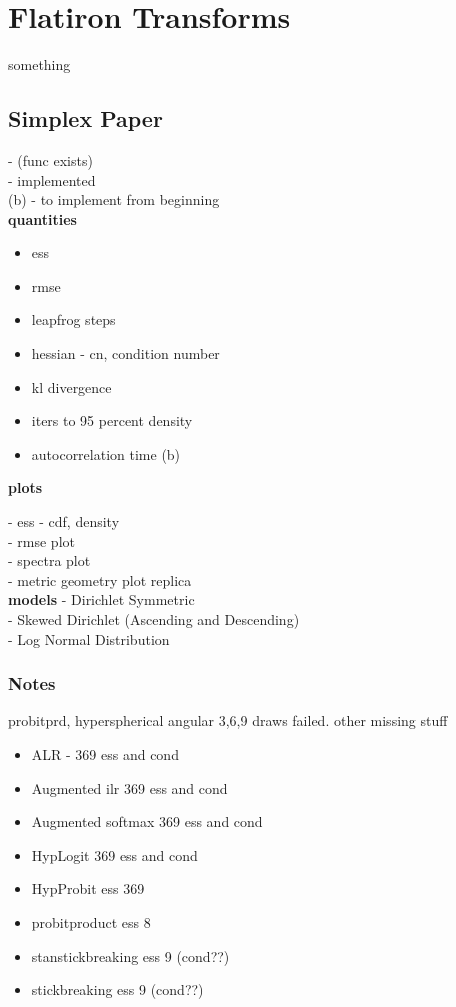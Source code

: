 \section{Flatiron Transforms}
something
\subsection{Simplex Paper}

\* - (func exists)\\
\*\* - implemented\\
(b) - to implement from beginning\\

\textbf{quantities}
\begin{itemize}
\item ess \*\*\\
\item rmse \*\*\\
\item leapfrog steps \*\*\\
\item hessian - cn, condition number \*\\
\item kl divergence \*\*\\
\item iters to 95 percent density \*\\
\item autocorrelation time (b)\\
\end{itemize}

\textbf{plots}

- ess - cdf, density\\
- rmse plot\\
- spectra plot\\
- metric geometry plot replica\\

\textbf{models}
- Dirichlet Symmetric\\
- Skewed Dirichlet (Ascending and Descending)\\
- Log Normal Distribution\\


\subsubsection{Notes}
probitprd, hyperspherical angular 3,6,9 draws failed. other missing stuff
\begin{itemize}

\item ALR - 369 ess and cond
\item Augmented ilr 369 ess and cond
\item Augmented softmax 369 ess and cond
\item HypLogit 369 ess and cond
\item HypProbit ess 369

\item probitproduct ess 8
\item stanstickbreaking ess 9 (cond??)
\item stickbreaking ess 9 (cond??)
\end{itemize}


